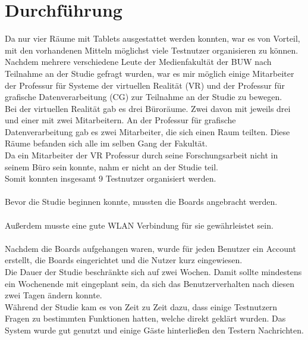 \section{Durchführung}\label{Durchführung}
Da nur vier Räume mit Tablets ausgestattet werden konnten, war es von Vorteil, mit den vorhandenen Mitteln möglichst viele Testnutzer organisieren zu können.
Nachdem mehrere verschiedene Leute der Medienfakultät der BUW nach Teilnahme an der Studie gefragt wurden, war es mir möglich einige Mitarbeiter der Professur für Systeme der virtuellen Realität (VR) und der Professur für grafische Datenverarbeitung (CG) zur Teilnahme an der Studie zu bewegen.
\\
Bei der virtuellen Realität gab es drei Büroräume.
Zwei davon mit jeweils drei und einer mit zwei Mitarbeitern.
An der Professur für grafische Datenverarbeitung gab es zwei Mitarbeiter, die sich einen Raum teilten.
Diese Räume befanden sich alle im selben Gang der Fakultät.
\\
Da ein Mitarbeiter der VR Professur durch seine Forschungsarbeit nicht in seinem Büro sein konnte, nahm er nicht an der Studie teil.
\\
Somit konnten insgesamt 9  Testnutzer organisiert werden.
\\
\\
Bevor die Studie beginnen konnte, mussten die Boards angebracht werden.
\\\\
Außerdem musste eine gute WLAN Verbindung für sie gewährleistet sein.
\\\\
Nachdem die Boards aufgehangen waren, wurde für jeden Benutzer ein Account erstellt, die Boards eingerichtet und die Nutzer kurz eingewiesen.
\\
Die Dauer der Studie beschränkte sich auf zwei Wochen.
Damit sollte mindestens ein Wochenende mit eingeplant sein, da sich das Benutzerverhalten nach diesen zwei Tagen ändern konnte.
\\
Während der Studie kam es von Zeit zu Zeit dazu, dass einige Testnutzern Fragen zu bestimmten Funktionen hatten, welche direkt geklärt wurden.
Das System wurde gut genutzt und einige Gäste hinterließen den Testern Nachrichten.
\\




